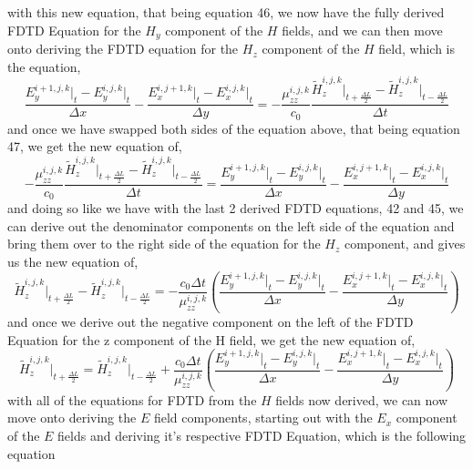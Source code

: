 \documentclass[]{article}
\begin{document}
with this new equation, that being equation 46, we now have the fully derived FDTD Equation for the $H_y$ component of the $H$ fields, and we can then move onto deriving the FDTD equation for the $H_z$ component of the $H$ field, which is the equation,
\begin{equation}
\frac{E_{y}^{i+1, j, k} \Big|_t - E_{y}^{i,j,k}\Big|_t}{\Delta{x}} - \frac{E_{x}^{i, j+1, k} \Big|_t - E_{x}^{i,j,k}\Big|_t}{\Delta{y}} = -\frac{\mu_{zz}^{i,j,k}}{c_0} \frac{\tilde{H}_{z}^{i,j,k}\Big|_{t+\frac{\Delta{L}}{2}} - \tilde{H}_{z}^{i,j,k}\Big|_{t - \frac{\Delta{L}}{2}}}{\Delta{t}}
\end{equation}
and once we have swapped both sides of the equation above, that being equation 47, we get the new equation of,
\begin{equation}
-\frac{\mu_{zz}^{i,j,k}}{c_0} \frac{\tilde{H}_{z}^{i,j,k}\Big|_{t+\frac{\Delta{L}}{2}} - \tilde{H}_{z}^{i,j,k}\Big|_{t - \frac{\Delta{L}}{2}}}{\Delta{t}} = \frac{E_{y}^{i+1, j, k} \Big|_t - E_{y}^{i,j,k}\Big|_t}{\Delta{x}} - \frac{E_{x}^{i, j+1, k} \Big|_t - E_{x}^{i,j,k}\Big|_t}{\Delta{y}}
\end{equation}
and doing so like we have with the last 2 derived FDTD equations, 42 and 45, we can derive out the denominator components on the left side of the equation and bring them over to the right side of the equation for the $H_z$ component, and gives us the new equation of,
\begin{equation}
\tilde{H}_{z}^{i,j,k}\Big|_{t+\frac{\Delta{L}}{2}} - \tilde{H}_{z}^{i,j,k}\Big|_{t - \frac{\Delta{L}}{2}} = -\frac{c_0\Delta{t}}{\mu_{zz}^{i,j,k}} \left(\frac{E_{y}^{i+1, j, k} \Big|_t - E_{y}^{i,j,k}\Big|_t}{\Delta{x}} - \frac{E_{x}^{i, j+1, k} \Big|_t - E_{x}^{i,j,k}\Big|_t}{\Delta{y}}\right)
\end{equation}
and once we derive out the negative component on the left of the FDTD Equation for the z component of the H field, we get the new equation of,
\begin{equation}
\tilde{H}_{z}^{i,j,k}\Big|_{t+\frac{\Delta{L}}{2}} = \tilde{H}_{z}^{i,j,k}\Big|_{t - \frac{\Delta{L}}{2}} + \frac{c_0\Delta{t}}{\mu_{zz}^{i,j,k}} \left(\frac{E_{y}^{i+1, j, k} \Big|_t - E_{y}^{i,j,k}\Big|_t}{\Delta{x}} - \frac{E_{x}^{i, j+1, k} \Big|_t - E_{x}^{i,j,k}\Big|_t}{\Delta{y}}\right)
\end{equation}
with all of the equations for FDTD from the $H$ fields now derived, we can now move onto deriving the $E$ field components, starting out with the $E_x$ component of the $E$ fields and deriving it's respective FDTD Equation, which is the following equation
\end{document}
